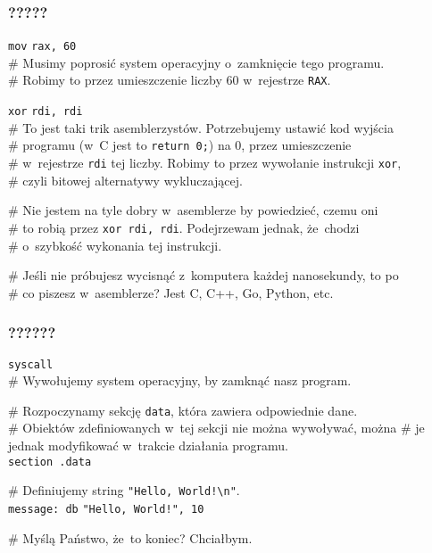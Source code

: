 \documentclass[10pt,t]{beamer}
\begin{document}
\begin{frame}
  \frametitle{?????}


  \hphantom{aaaaaaaaa} \texttt{mov} \hphantom{aaaaaa} \texttt{rax, 60} \\
  \# Musimy poprosić system operacyjny o~zamknięcie tego programu. \\
  \# Robimy to przez umieszczenie liczby $60$ w~rejestrze \texttt{RAX}.

  \hphantom{aaaaaaaaa} \texttt{xor} \hphantom{aaaaaa} \texttt{rdi, rdi} \\
  \# To jest taki trik asemblerzystów. Potrzebujemy ustawić kod wyjścia \\
  \# programu (w~C jest to \texttt{return 0;}) na $0$, przez umieszczenie \\
  \# w~rejestrze \texttt{rdi} tej liczby. Robimy to przez wywołanie
  instrukcji \texttt{xor}, \\
  \# czyli bitowej alternatywy wykluczającej.

  \# Nie jestem na tyle dobry w~asemblerze by powiedzieć, czemu oni \\
  \# to robią przez \texttt{xor rdi, rdi}. Podejrzewam jednak, że~chodzi \\
  \# o~szybkość wykonania tej instrukcji.

  \# Jeśli nie próbujesz wycisnąć z~komputera każdej nanosekundy, to po \\
  \# co piszesz w~asemblerze? Jest C, C++, Go, Python, etc.

\end{frame}





\begin{frame}
  \frametitle{??????}


  \hphantom{aaaaaaaaa} \texttt{syscall} \\
  \# Wywołujemy system operacyjny, by zamknąć nasz program.

  \# Rozpoczynamy sekcję \texttt{data}, która zawiera odpowiednie
  dane. \\
  \# Obiektów zdefiniowanych w~tej sekcji nie można wywoływać, można
  \# je jednak modyfikować w~trakcie działania programu. \\
  \hphantom{aaaaaaaaa} \texttt{section .data} \\
  \vspace{0.8em}

  \# Definiujemy string \texttt{"Hello, World!\textbackslash n"}. \\
  \texttt{message: db} \hphantom{aaaaa} \texttt{"Hello, World!", 10}

  \# Myślą Państwo, że~to koniec? Chciałbym.

\end{frame}
\end{document}
